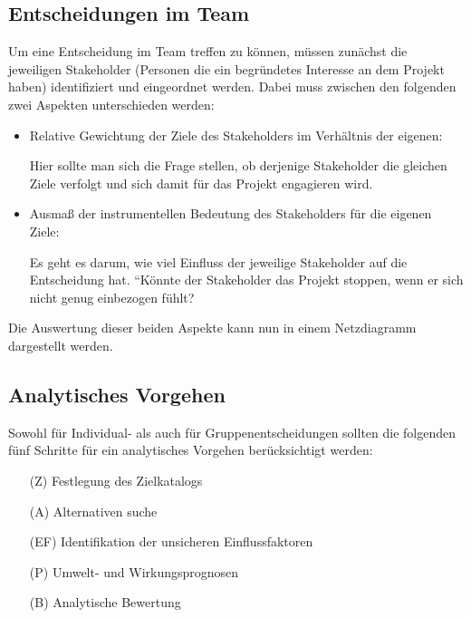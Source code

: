 \documentclass{panikzettel}
\begin{document}
\subsection{Entscheidungen im Team}
Um eine Entscheidung im Team treffen zu können, müssen zunächst die jeweiligen Stakeholder (Personen die ein begründetes Interesse an dem Projekt haben) identifiziert und eingeordnet werden. Dabei muss zwischen den folgenden zwei Aspekten unterschieden werden:
\begin{itemize}
	\item Relative Gewichtung der Ziele des  Stakeholders im Verhältnis der eigenen:

	Hier sollte man sich die Frage stellen, ob derjenige Stakeholder die gleichen Ziele verfolgt und sich damit für das Projekt engagieren wird.

	\item Ausmaß der instrumentellen Bedeutung des Stakeholders für die eigenen Ziele:

	Es geht es darum, wie viel Einfluss der jeweilige Stakeholder auf die Entscheidung hat. ``Könnte der Stakeholder das Projekt stoppen, wenn er sich nicht genug einbezogen fühlt?\grqq
\end{itemize}
Die Auswertung dieser beiden Aspekte kann nun in einem Netzdiagramm dargestellt werden.

\subsection{Analytisches Vorgehen \cite{vonNitzsch:211553}}
Sowohl für Individual- als auch für Gruppenentscheidungen sollten die folgenden fünf Schritte für ein analytisches Vorgehen berücksichtigt werden:
\begin{enumerate}
	\item[(Z)] Festlegung des Zielkatalogs
	\item[(A)] Alternativen suche
	\item[(EF)] Identifikation der unsicheren Einflussfaktoren
	\item[(P)] Umwelt- und Wirkungsprognosen
	\item[(B)] Analytische Bewertung
\end{enumerate}
\end{document}

